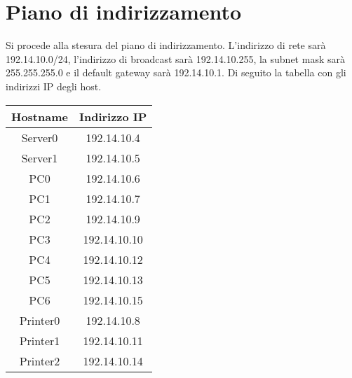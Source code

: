 \section{Piano di indirizzamento}
\hspace{24pt}Si procede alla stesura del piano di indirizzamento. L'indirizzo di rete sarà 192.14.10.0/24, l'indirizzo di broadcast sarà 192.14.10.255, la subnet mask sarà 255.255.255.0 e il default gateway sarà 192.14.10.1. Di seguito la tabella con gli indirizzi IP degli host.\\
\vspace{20pt}
\begin{center}
\begin{tabular}{| c | c |}
	\hline
	Hostname & Indirizzo IP \\
	\hline
	Server0 & 192.14.10.4 \\ 
	\hline
	Server1 & 192.14.10.5 \\
	\hline
	PC0 & 192.14.10.6 \\
	\hline
	PC1 & 192.14.10.7 \\
	\hline
	PC2 & 192.14.10.9 \\
	\hline
	PC3 & 192.14.10.10 \\
	\hline
	PC4 & 192.14.10.12 \\
	\hline
	PC5 & 192.14.10.13 \\
	\hline
	PC6 & 192.14.10.15 \\
	\hline
	Printer0 & 192.14.10.8 \\
	\hline
	Printer1 & 192.14.10.11 \\
	\hline
	Printer2 & 192.14.10.14 \\
	\hline
\end{tabular}
\end{center}
\vspace{20pt}